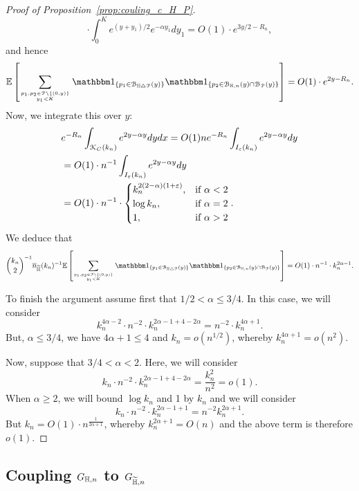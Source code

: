 \begin{proof}[Proof of Proposition~\ref{prop:couling_c_H_P}]
\[	\cdot \int_0^K e^{(y+y_1)/2} 
	e^{-\alpha y_1}   dy_1 = O(1)\cdot e^{3y/2 - R_n}, 
\]
and hence
\begin{align*}
	\Exp { \sum_{p_1,p_2 \in\Pcal \setminus \{(0,y)\} \atop y_1 < K}
	\ind{p_1\in \BallSym{y}} \ind{p_2\in \BallHyp{y}\cap \BallPo{y}}} 
	= O(1) \cdot e^{2y - R_n}.
\end{align*}
Now, we integrate this over $y$: 
\begin{align*}
	&e^{-R_n} \int_{{\mathcal K}_{C}(k_n)} e^{2y -\alpha y} dy dx = O(1) n e^{-R_n} \int_{I_\varepsilon (k_n)} e^{2y -\alpha y} dy \\
	&= O(1) \cdot n^{-1} \int_{I_\varepsilon (k_n)} e^{2y -\alpha y} dy \\
	&= O(1) \cdot n^{-1} \cdot 
		\begin{cases}
		k_n^{2(2-\alpha) (1+\varepsilon)}, & \mbox{if $\alpha < 2$} \\
		\log k_n, & \mbox{if $\alpha =2$} \\
		1, & \mbox{if $\alpha >2$}
		\end{cases}.
\end{align*}
We deduce that
\[
	\binom{k_n}{2}^{-1} \expH^{-1} \Exp { \sum_{p_1,p_2 \in\Pcal \setminus \{(0,y)\} \atop y_1 < K}
	\ind{p_1\in \BallSym{y}} \ind{p_2\in \BallHyp{y}\cap \BallPo{y}}}
	= O(1) \cdot n^{-1} \cdot k_n^{2\alpha -1}.
\]

To finish the argument assume first that $1/2 <\alpha \leq 3/4$. In this case, we will consider
\[
	k_n^{4\alpha -2} \cdot n^{-2} \cdot k_n^{2\alpha -1 + 4 - 2\alpha} = 
	n^{-2} \cdot k_n^{4\alpha +1}.
\]
But, $\alpha \leq 3/4$, we have $4\alpha +1 \leq 4$ and $k_n = o(n^{1/2})$, whereby $k_n^{4\alpha +1} = o(n^{2})$. 

Now, suppose that $3/4 < \alpha < 2$. Here, we will consider 
\[
	k_n \cdot n^{-2} \cdot k_n^{2\alpha -1 + 4 - 2\alpha} =\frac{k_n^2}{n^2} = o(1).
\] 
When $\alpha \geq 2$, we will bound $\log k_n$ and 1 by $k_n$ and we will consider 
\[
	k_n \cdot n^{-2} \cdot k_n^{2\alpha -1 +1}= n^{-2} k_n^{2\alpha +1}.
\] 
But $k_n = O(1)\cdot n^{\frac{1}{2\alpha +1}}$, whereby $k_n^{2\alpha +1} =O(n)$ and 
the above term is therefore $o(1)$.

\end{proof}



\subsection{Coupling $G_{\mathbb{H},n}$ to $G_{\widetilde{\mathbb{H}},n}$}\label{ssec:coupling_H_HP}

